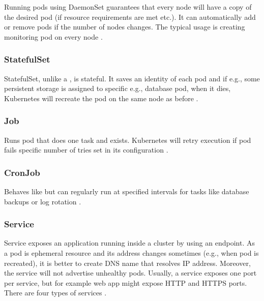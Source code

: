 Running pods using DaemonSet guarantees that every node will have a copy of the desired pod (if resource requirements are met etc.). It can automatically add or remove pods if the number of nodes changes. The typical usage is creating monitoring pod on every node \cite{KubernetesDaemonSet}. 


\subsubsection{StatefulSet}
\label{statefulset}

StatefulSet, unlike a \textit{}, is stateful. It saves an identity of each pod and if e.g., some persistent storage is assigned to specific e.g., database pod, when it dies, Kubernetes will recreate the pod on the same node as before \cite{KubernetesStatefulSet}.

\subsubsection{Job}
\label{job}

Runs pod that does one task and exists. Kubernetes will retry execution if pod fails specific number of tries set in its configuration \cite{KubernetesJobs}.

\subsubsection{CronJob}
\label{cronjob}
Behaves like \textit{} but can regularly run at specified intervals for tasks like database backups or log rotation \cite{KubernetesCronJob}. 

\subsubsection{Service}
\label{svc}

Service exposes an application running inside a cluster by using an endpoint. As a pod is ephemeral resource and its address changes sometimes (e.g., when pod is recreated), it is better to create DNS name that resolves IP address. Moreover, the service will not advertise unhealthy pods. Usually, a service exposes one port per service, but for example web app might expose HTTP and HTTPS ports. There are four types of services \cite{KubernetesService}. 


